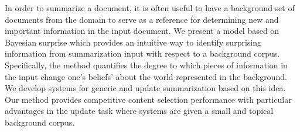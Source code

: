 In order to summarize a document, it is often useful to have a background set of documents from the domain to serve as a reference for determining new and important information in the input document. We present a model based on Bayesian surprise which provides an intuitive way to identify surprising information from summarization input with respect to a background corpus. Specifically, the method quantifies the degree to which pieces of information in the input change one's beliefs' about the world represented in the background. We develop systems for generic and update summarization based on this idea. Our method provides competitive content selection performance with particular advantages in the update task where systems are given a small and topical background corpus.
